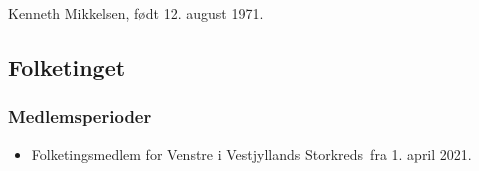 \documentclass[11pt, a4paper]{awesome-cv}
\begin{document}
\makecvheader[R]
\makelettertitle
\begin{cvletter}
Kenneth Mikkelsen, født 12. august 1971.

\subsection*{Folketinget}
\subsubsection*{Medlemsperioder}
\begin{itemize}
\item Folketingsmedlem for Venstre i Vestjyllands Storkreds fra 1. april 2021.
\end{itemize}
\end{cvletter}
\end{document}
